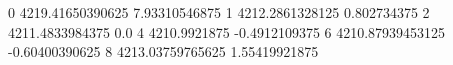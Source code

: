 0 4219.41650390625 7.93310546875
1 4212.2861328125 0.802734375
2 4211.4833984375 0.0
4 4210.9921875 -0.4912109375
6 4210.87939453125 -0.60400390625
8 4213.03759765625 1.55419921875
